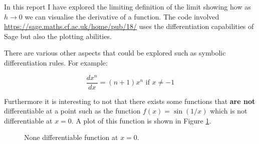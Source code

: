 \documentclass[a4paper]{article}
\begin{document}
In this report I have explored the limiting definition of the limit showing how as $h\to 0$ we can visualise the derivative of a function. The code involved \url{https://sage.maths.cf.ac.uk/home/pub/18/} uses the differentiation capabilities of Sage but also the plotting abilities.

There are various other aspects that could be explored such as symbolic differentiation rules. For example:

$$\frac{dx^n}{dx}=(n+1)x^{n}\text{ if }x\ne-1$$

Furthermore it is interesting to not that there exists some functions that \textbf{are not} differentiable at a point such as the function $f(x)=\sin(1/x)$ which is not differentiable at $x=0$. A plot of this function is shown in Figure \ref{notdiff}.

\begin{figure}[!htbp]
\begin{center}
\end{center}
\caption{None differentiable function at $x=0$.}\label{notdiff}
\end{figure}



%
\end{document}
